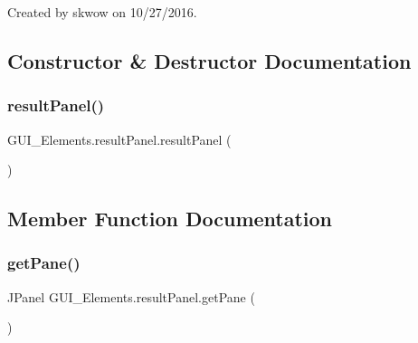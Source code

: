 Created by skwow on 10/27/2016. 

\subsection{Constructor \& Destructor Documentation}
\hypertarget{class_g_u_i___elements_1_1result_panel_ae3658e3ae9e9685a8313ddc8f76426bf}{}\label{class_g_u_i___elements_1_1result_panel_ae3658e3ae9e9685a8313ddc8f76426bf} 
\subsubsection{\texorpdfstring{result\+Panel()}{resultPanel()}}
{\footnotesize\ttfamily G\+U\+I\+\_\+\+Elements.\+result\+Panel.\+result\+Panel (\begin{DoxyParamCaption}{ }\end{DoxyParamCaption})}



\subsection{Member Function Documentation}
\hypertarget{class_g_u_i___elements_1_1result_panel_ad5c462dff38294c96ee565dc5f258566}{}\label{class_g_u_i___elements_1_1result_panel_ad5c462dff38294c96ee565dc5f258566} 
\subsubsection{\texorpdfstring{get\+Pane()}{getPane()}}
{\footnotesize\ttfamily J\+Panel G\+U\+I\+\_\+\+Elements.\+result\+Panel.\+get\+Pane (\begin{DoxyParamCaption}{ }\end{DoxyParamCaption})}

\hypertarget{class_g_u_i___elements_1_1result_panel_abba17e8bbb434ee86c7f95d00167c99d}{}\label{class_g_u_i___elements_1_1result_panel_abba17e8bbb434ee86c7f95d00167c99d} 
